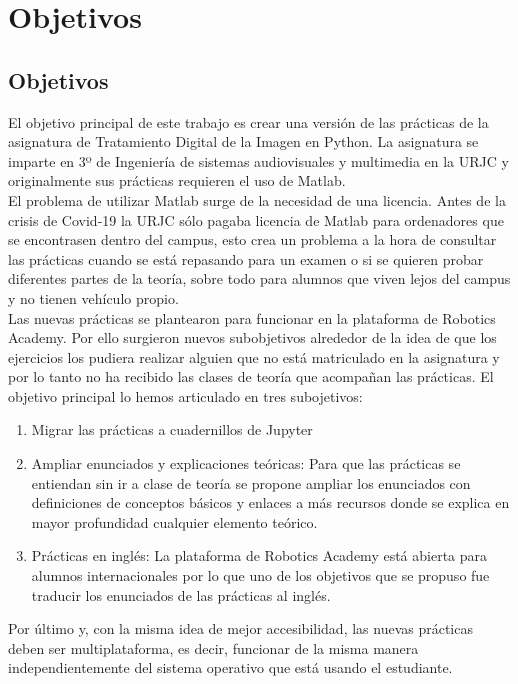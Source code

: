 \chapter{Objetivos}

\section{Objetivos}

El objetivo principal de este trabajo es crear una versión de las prácticas de la asignatura de Tratamiento Digital de la Imagen en Python. La asignatura se imparte en 3º de Ingeniería de sistemas audiovisuales y multimedia en la URJC y originalmente sus prácticas requieren el uso de Matlab. \\

El problema de utilizar Matlab surge de la necesidad de una licencia. Antes de la crisis de Covid-19 la URJC sólo pagaba licencia de Matlab para ordenadores que se encontrasen dentro del campus, esto crea un problema a la hora de consultar las prácticas cuando se está repasando para un examen o si se quieren probar diferentes partes de la teoría, sobre todo para alumnos que viven lejos del campus y no tienen vehículo propio.\\

Las nuevas prácticas se plantearon para funcionar en la plataforma de Robotics Academy. Por ello surgieron nuevos subobjetivos alrededor de la idea de que los ejercicios los pudiera realizar alguien que no está matriculado en la asignatura y por lo tanto no ha recibido las clases de teoría que acompañan las prácticas. El objetivo principal lo hemos articulado en tres subojetivos:
\begin{enumerate}
    \item Migrar las prácticas a cuadernillos de Jupyter
    \item Ampliar enunciados y explicaciones teóricas: Para que las prácticas se entiendan sin ir a clase de teoría se propone ampliar los enunciados con definiciones de conceptos básicos y enlaces a más recursos donde se explica en mayor profundidad cualquier elemento teórico.
    \item Prácticas en inglés: La plataforma de Robotics Academy está abierta para alumnos internacionales por lo que uno de los objetivos que se propuso fue traducir los enunciados de las prácticas al inglés.
\end{enumerate}

Por último y, con la misma idea de mejor accesibilidad, las nuevas prácticas deben ser multiplataforma, es decir, funcionar de la misma manera independientemente del sistema operativo que está usando el estudiante.

